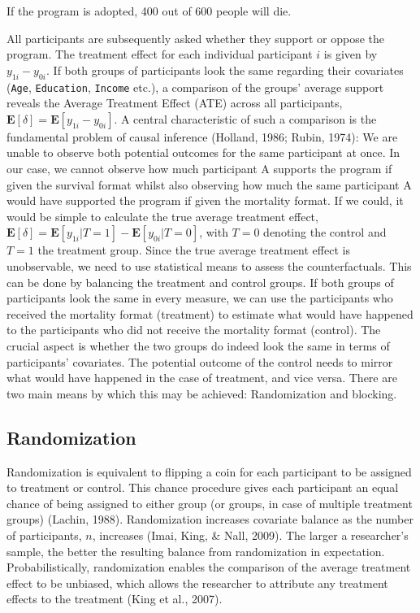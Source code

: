 \documentclass[12pt,econ]{sources/authesis}
\begin{document}
\vspace{0.3cm}
\begin{adjustwidth}{50pt}{50pt}
\ssp
\noindent If the program is adopted, 400 out of 600 people will die.
\end{adjustwidth}
All participants are subsequently asked whether they support or oppose the program. The treatment effect for each individual participant \(i\) is given by \(y_{1i} - y_{0i}\). If both groups of participants look the same regarding their covariates (\texttt{Age}, \texttt{Education}, \texttt{Income} etc.), a comparison of the groups' average support reveals the Average Treatment Effect (ATE) across all participants, \(\mathbf{E}[\delta] = \mathbf{E}[y_{1i} - y_{0i}]\). A central characteristic of such a comparison is the fundamental problem of causal inference (Holland, 1986; Rubin, 1974): We are unable to observe both potential outcomes for the same participant at once. In our case, we cannot observe how much participant A supports the program if given the survival format whilst also observing how much the same participant A would have supported the program if given the mortality format. If we could, it would be simple to calculate the true average treatment effect, \(\mathbf{E}[\delta] = \mathbf{E}[y_{1i}|T=1] - \mathbf{E}[y_{0i}|T=0]\), with \(T=0\) denoting the control and \(T=1\) the treatment group. Since the true average treatment effect is unobservable, we need to use statistical means to assess the counterfactuals. This can be done by balancing the treatment and control groups. If both groups of participants look the same in every measure, we can use the participants who received the mortality format (treatment) to estimate what would have happened to the participants who did not receive the mortality format (control). The crucial aspect is whether the two groups do indeed look the same in terms of participants' covariates. The potential outcome of the control needs to mirror what would have happened in the case of treatment, and vice versa. There are two main means by which this may be achieved: Randomization and blocking.

\hypertarget{ordblock-theory-randomization}{%
\subsection{Randomization}\label{ordblock-theory-randomization}}

Randomization is equivalent to flipping a coin for each participant to be assigned to treatment or control. This chance procedure gives each participant an equal chance of being assigned to either group (or groups, in case of multiple treatment groups) (Lachin, 1988). Randomization increases covariate balance as the number of participants, \(n\), increases (Imai, King, \& Nall, 2009). The larger a researcher's sample, the better the resulting balance from randomization in expectation. Probabilistically, randomization enables the comparison of the average treatment effect to be unbiased, which allows the researcher to attribute any treatment effects to the treatment (King et al., 2007).
\end{document}
